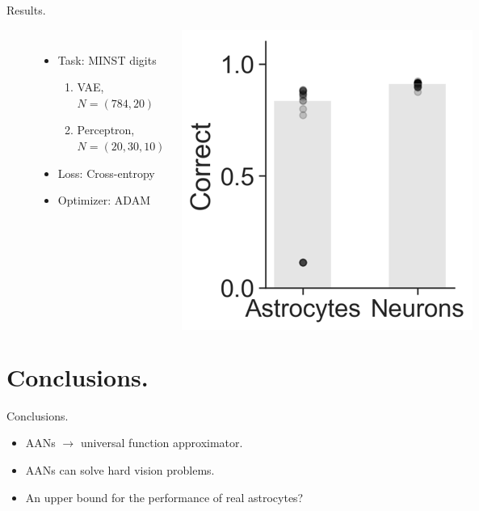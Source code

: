 \documentclass[10pt]{beamer}
\begin{document}
\begin{frame}[fragile]{Results.}
\begin{figure}
\begin{columns}
    \begin{itemize}
        \item Task: MINST digits
        \begin{enumerate}
            \item VAE, $N=(784,20)$
            \item Perceptron, $N=(20,30,10)$    
        \end{enumerate}
        \item Loss: Cross-entropy
        \item Optimizer: ADAM
    \end{itemize}
    \centering
    \includegraphics[scale=0.4]{images/results.png} 
\end{columns}
\end{figure}
\end{frame}

\section[Conclusions.]{Conclusions.}
\begin{frame}[fragile]{Conclusions.}
\begin{itemize}
\item AANs $\rightarrow$ universal function approximator.
\item AANs can solve hard vision problems.
\item An \alert{upper bound} for the performance of real astrocytes? 
\end{itemize}
\end{frame}
\end{document}
